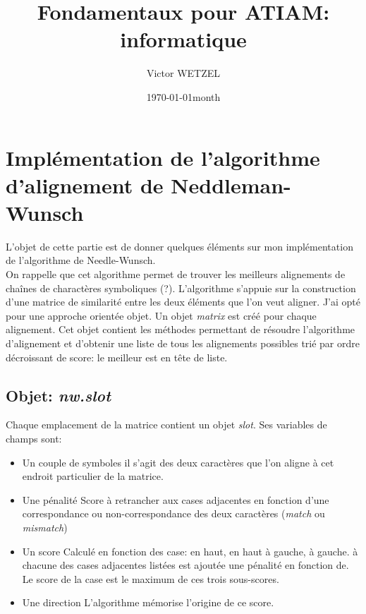 

\title{Fondamentaux pour ATIAM: informatique}
\author{Victor WETZEL}
\date{\today{month}}						


\title{}


\newpage
\tableofcontents

\newpage
{}%

\section{Implémentation de l'algorithme d'alignement de Neddleman-Wunsch}
L'objet de cette partie est de donner quelques éléments sur mon implémentation
de l'algorithme de Needle-Wunsch.\\
On rappelle que cet algorithme permet de trouver les meilleurs alignements de
chaînes de charactères symboliques (?). L'algorithme s'appuie sur la
construction d'une matrice de similarité entre les deux éléments que l'on veut
aligner. J'ai opté pour une approche orientée objet. Un objet \textit{matrix}
est créé pour chaque alignement. Cet objet contient les méthodes permettant de
résoudre l'algorithme d'alignement et d'obtenir une liste de tous les
alignements possibles trié par ordre décroissant de score: le meilleur est en
tête de liste.

\subsection{Objet: \textit{nw.slot}}
Chaque emplacement de la matrice contient un objet \textit{slot}. Ses variables
de champs sont:
\begin{itemize}
  \item{Un couple de symboles} il s'agit des deux caractères que l'on aligne à
    cet endroit particulier de la matrice.
  \item{Une pénalité} Score à retrancher aux cases adjacentes en fonction d'une
    correspondance ou non-correspondance des deux
    caractères (\textit{match} ou \textit{mismatch})
  \item{Un score} Calculé en fonction des case: en haut, en haut à gauche,
    à gauche. à chacune des cases adjacentes listées est ajoutée une
    pénalité en fonction de. Le score de la case est le
    maximum de ces trois sous-scores.
  \item{Une direction}  L'algorithme mémorise l'origine de ce score. 
\end{itemize}


